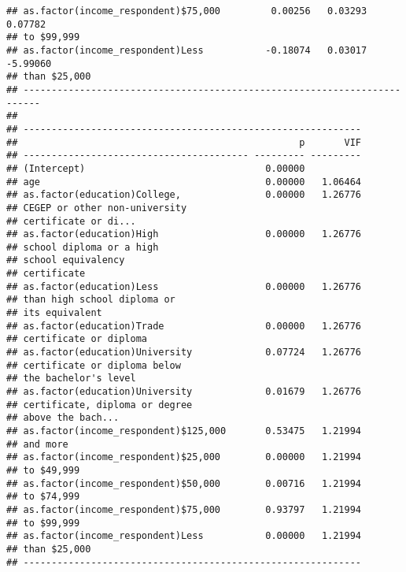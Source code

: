 \documentclass[
]{article}
\begin{document}
\begin{verbatim}
## as.factor(income_respondent)$75,000         0.00256   0.03293     0.07782
## to $99,999                                                               
## as.factor(income_respondent)Less           -0.18074   0.03017    -5.99060
## than $25,000                                                             
## -------------------------------------------------------------------------
##  
## ------------------------------------------------------------
##                                                  p       VIF
## ---------------------------------------- --------- ---------
## (Intercept)                                0.00000          
## age                                        0.00000   1.06464
## as.factor(education)College,               0.00000   1.26776
## CEGEP or other non-university                               
## certificate or di...                                        
## as.factor(education)High                   0.00000   1.26776
## school diploma or a high                                    
## school equivalency                                          
## certificate                                                 
## as.factor(education)Less                   0.00000   1.26776
## than high school diploma or                                 
## its equivalent                                              
## as.factor(education)Trade                  0.00000   1.26776
## certificate or diploma                                      
## as.factor(education)University             0.07724   1.26776
## certificate or diploma below                                
## the bachelor's level                                        
## as.factor(education)University             0.01679   1.26776
## certificate, diploma or degree                              
## above the bach...                                           
## as.factor(income_respondent)$125,000       0.53475   1.21994
## and more                                                    
## as.factor(income_respondent)$25,000        0.00000   1.21994
## to $49,999                                                  
## as.factor(income_respondent)$50,000        0.00716   1.21994
## to $74,999                                                  
## as.factor(income_respondent)$75,000        0.93797   1.21994
## to $99,999                                                  
## as.factor(income_respondent)Less           0.00000   1.21994
## than $25,000                                                
## ------------------------------------------------------------
\end{verbatim}
\end{document}
